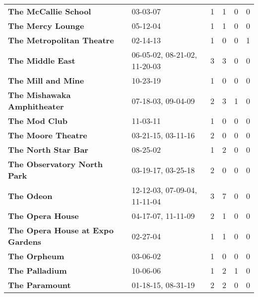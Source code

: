 \begin{supertabular}{llllll}
                                         \textbf{The McCallie School} &                      03-03-07 &  1 &   1 &  0 &  0 \\
                                            \textbf{The Mercy Lounge} &                      05-12-04 &  1 &   1 &  0 &  0 \\
                                    \textbf{The Metropolitan Theatre} &                      02-14-13 &  1 &   0 &  0 &  1 \\
                                             \textbf{The Middle East} &  06-05-02, 08-21-02, 11-20-03 &  3 &   3 &  0 &  0 \\
                                           \textbf{The Mill and Mine} &                      10-23-19 &  1 &   0 &  0 &  0 \\
                                  \textbf{The Mishawaka Amphitheater} &            07-18-03, 09-04-09 &  2 &   3 &  1 &  0 \\
                                                \textbf{The Mod Club} &                      11-03-11 &  1 &   0 &  0 &  0 \\
                                           \textbf{The Moore Theatre} &            03-21-15, 03-11-16 &  2 &   0 &  0 &  0 \\
                                          \textbf{The North Star Bar} &                      08-25-02 &  1 &   2 &  0 &  0 \\
                                  \textbf{The Observatory North Park} &            03-19-17, 03-25-18 &  2 &   0 &  0 &  0 \\
                                                   \textbf{The Odeon} &  12-12-03, 07-09-04, 11-11-04 &  3 &   7 &  0 &  0 \\
                                             \textbf{The Opera House} &            04-17-07, 11-11-09 &  2 &   1 &  0 &  0 \\
                             \textbf{The Opera House at Expo Gardens} &                      02-27-04 &  1 &   1 &  0 &  0 \\
                                                 \textbf{The Orpheum} &                      03-06-02 &  1 &   0 &  0 &  0 \\
                                               \textbf{The Palladium} &                      10-06-06 &  1 &   2 &  1 &  0 \\
                                               \textbf{The Paramount} &            01-18-15, 08-31-19 &  2 &   2 &  0 &  0 \\

\end{supertabular}
